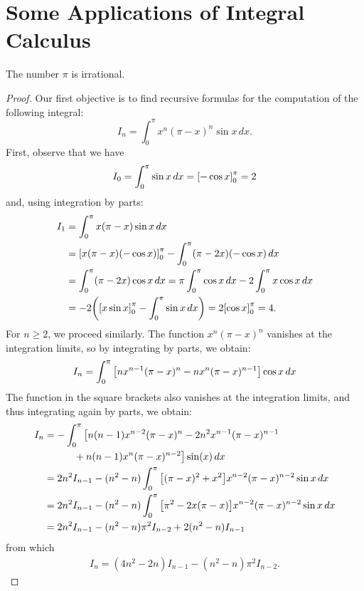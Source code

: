 \section{Some Applications of Integral Calculus}

\begin{theorem}[Irrationality of $\pi$]
The number $\pi$ is irrational.
\end{theorem}
%
\begin{proof}
Our first objective is to find recursive formulas for the computation of the
following integral:
\[
  I_n = \int_0^\pi x^n (\pi-x)^n \sin x\, dx.
\]
First, observe that we have
\[
  I_0 = \int_0^\pi \sin x\, dx = {\left[ -\cos x \right]}_0^\pi = 2
\]
and, using integration by parts:
\begin{align*}
  I_1 &= \int_0^\pi x(\pi-x)\sin x\, dx\\
      &= {\left[ x(\pi-x)(-\cos x) \right]}_0^\pi
       -\int_0^\pi (\pi-2x)(-\cos x)\, dx \\
      &= \int_0^\pi (\pi-2x)\cos x\, dx
      = \pi \int_0^\pi \cos x\, dx - 2 \int_0^\pi x\cos x\, dx \\
      &= - 2 {\left( {\left[ x\sin x \right]}_0^\pi - \int_0^\pi \sin x\, dx \right)}
      = 2 {\left[ \cos x \right]}_0^\pi = 4.
\end{align*}
For $n\ge 2$, we proceed similarly. The function $x^n (\pi-x)^n$ vanishes at the
integration limits, so by integrating by parts, we obtain:
\[
    I_n = \int_0^\pi {\left[ n x^{n-1}(\pi-x)^n - n x^n (\pi-x)^{n-1} \right]} \cos x\,
  dx
\]
The function in the square brackets also vanishes at the integration limits, and
thus integrating again by parts, we obtain:
\begin{align*}
  I_n &= -\int_0^\pi \big[n(n-1) x^{n-2}(\pi-x)^n
    - 2n^2 x^{n-1}(\pi-x)^{n-1} \\
  &\qquad\quad   + n(n-1) x^n(\pi-x)^{n-2}\big] \sin(x)\, dx \\
    &= 2n^2 I_{n-1} - (n^2-n) \int_0^\pi {\left[ (\pi-x)^2 +
  x^2 \right]}x^{n-2}(\pi-x)^{n-2} \sin x\, dx \\
    &= 2n^2 I_{n-1} - (n^2-n) \int_0^\pi {\left[ \pi^2 -
  2x(\pi-x) \right]}x^{n-2}(\pi-x)^{n-2}\sin x\, dx \\
  &= 2n^2 I_{n-1} - (n^2-n) \pi^2 I_{n-2} + 2(n^2-n) I_{n-1}
\end{align*}
from which
\begin{align}\label{eq:9530978}
   I_n = (4n^2-2n)I_{n-1} -(n^2-n)\pi^2 I_{n-2}.
\end{align}


\end{proof}
